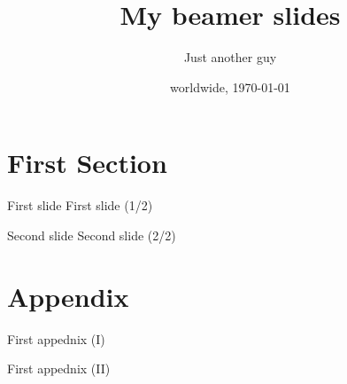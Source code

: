 \documentclass{beamer}
\title{My beamer slides}
\author{Just another guy}
\institute[ABC]{My famous ABC institute}
\date{worldwide, \today}
\begin{document}
\section{First Section}
\begin{frame}{First slide}
First slide (1/2)
\end{frame}

\begin{frame}{Second slide}
Second slide (2/2)
\end{frame}


\appendix

\section{Appendix}
\begin{frame}
First appednix (I)
\end{frame}

\begin{frame}
    First appednix (II)
\end{frame}
\end{document}
